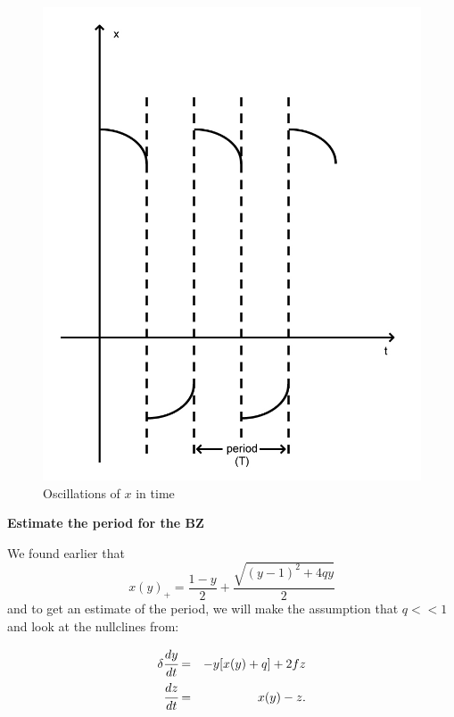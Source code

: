 \documentclass[]{article}
\numberwithin{equation}{section}		%
\def\bea{\begin{eqnarray}}
\def\ena{\end{eqnarray}}
\begin{document}
\begin{figure}
\caption{Oscillations of $x$ in time}
\begin{center}
\includegraphics[scale=.20]{figures/Oscillator_period.jpg}
\end{center}
\label{fig:oscper}
\end{figure}

{\bf{Estimate the period for the BZ}}

We found earlier that $$x(y)_{+}=\frac{1-y}{2}+\frac{\sqrt{(y-1)^2+4qy}}{2}$$
and to get an estimate of the period, we will make the assumption that $q<<1$ and look at the nullclines from:

\bea
\label{d_dy1}
\delta \cfrac{dy}{dt} & = & -y[x(y)+q]+ 2f z \\
\label{1_dz1}
\cfrac{dz}{dt} & = & x(y) - z.
\ena
\end{document}
